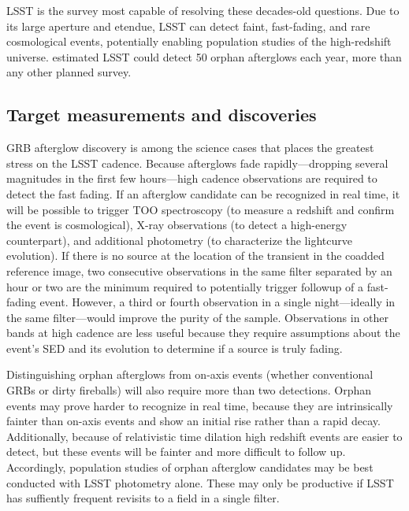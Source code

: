 LSST is the survey most capable of resolving these decades-old questions.  Due to its large aperture and etendue, LSST can detect faint, fast-fading, and rare cosmological events, potentially enabling population studies of the high-redshift universe.  
\citet{2015A&A...578A..71G} estimated LSST could detect 50 orphan afterglows each year, more than any other planned survey.





\subsection{Target measurements and discoveries}
\label{sec:keyword:targets}

GRB afterglow discovery is among the science cases that places the greatest stress on the LSST cadence.  Because afterglows fade rapidly---dropping several magnitudes in the first few hours---high cadence observations are required to detect the fast fading.  
If an afterglow candidate can be recognized in real time, it will be possible to trigger TOO spectroscopy (to measure a redshift and confirm the event is cosmological), X-ray observations (to detect a high-energy counterpart), and additional photometry (to characterize the lightcurve evolution).  If there is no source at the location of the transient in the coadded reference image, two consecutive observations in the same filter separated by an hour or two are the minimum required to potentially trigger followup of a fast-fading event.  
However, a third or fourth observation in a single night---ideally in the same filter---would improve the purity of the sample.  Observations in other bands at high cadence are less useful because they require assumptions about the event's SED and its evolution to determine if a source is truly fading.

Distinguishing orphan afterglows from on-axis events (whether conventional GRBs or dirty fireballs) will also require more than two detections.  Orphan events may prove harder to recognize in real time, because they are intrinsically fainter than on-axis events and show an initial rise rather than a rapid decay.  
Additionally, because of relativistic time dilation high redshift events are easier to detect, but these events will be fainter and more difficult to follow up.
Accordingly, population studies of orphan afterglow candidates may be best conducted with LSST photometry alone.  These may only be productive if LSST has suffiently frequent revisits to a field in a single filter.


